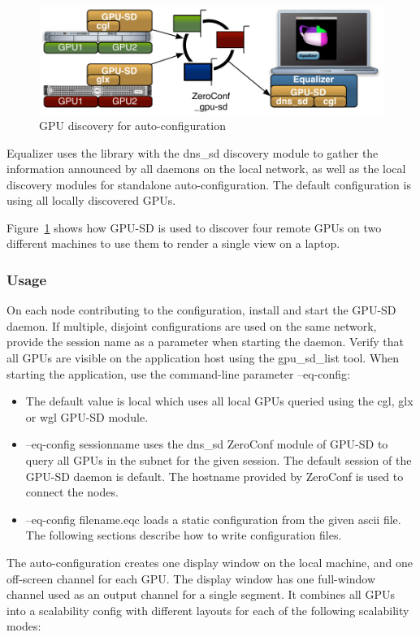 \documentclass[10pt,a4]{scrartcl}
\newcommand{\fig}[1]{Figure~\ref{#1}}
\begin{document}
\begin{figure}
  \includegraphics[width=.618\textwidth]{images/gpu-sd.pdf}
  {\caption{\label{fGPUSD}GPU discovery for auto-configuration}}
\end{figure}
Equalizer uses the library with the dns\_sd discovery module to gather the
information announced by all daemons on the local network, as well as the local
discovery modules for standalone auto-configuration. The default configuration
is using all locally discovered GPUs.

\fig{fGPUSD} shows how GPU-SD is used to discover four remote GPUs on two
different machines to use them to render a single view on a laptop.

\subsubsection{\label{sGPUSDUsage}Usage}

On each node contributing to the configuration, install and start the GPU-SD
daemon. If multiple, disjoint configurations are used on the same network,
provide the session name as a parameter when starting the daemon. Verify that
all GPUs are visible on the application host using the \textsf{gpu\_sd\_list}
tool. When starting the application, use the command-line parameter
\textsf{--eq-config}:

\begin{itemize}
\item The default value is \textsf{local} which uses all local GPUs queried
  using the cgl, glx or wgl GPU-SD module.
\item \textsf{--eq-config sessionname} uses the dns\_sd ZeroConf module of
  GPU-SD to query all GPUs in the subnet for the given session. The default
  session of the GPU-SD daemon is \textsf{default}. The hostname provided by
  ZeroConf is used to connect the nodes.
\item \textsf{--eq-config filename.eqc} loads a static configuration from the
  given ascii file. The following sections describe how to write configuration
  files.
\end{itemize}

The auto-configuration creates one display window on the local machine, and one
off-screen channel for each GPU. The display window has one full-window channel
used as an output channel for a single segment. It combines all GPUs into a
scalability config with different layouts for each of the following scalability
modes:
\end{document}
